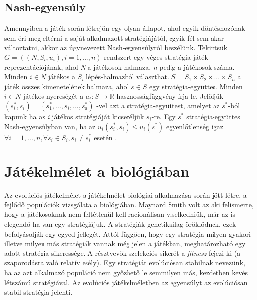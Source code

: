 \subsection{Nash-egyensúly}
Amennyiben a játék során létrejön egy olyan állapot, ahol egyik döntéshozónak sem éri meg eltérni a saját alkalmazott stratégiájától, egyik fél sem akar változtatni, akkor az úgynevezett Nash-egyensúlyról beszélünk. Tekintsük \(G = ((N,S_i,u_i), i = 1,...,n)\) rendszert egy véges stratégia játék reprezentációjának, ahol \textit{N} a játékosok halmaza, \textit{n} pedig a játékosok száma. Minden \(i \in N\) játékos a \(S_i\) lépés-halmazból választhat. \(S = S_1 \times S_2 \times ... \times S_n\)  a játék összes kimenetelének halmaza, ahol \(s \in S\) egy stratégia-együttes. Minden \(i \in N\) játékos nyereségét a \(u_i:S \to \mathbb{R}\) hasznosságfüggvény írja le. Jelöljük \((s_i^*,s_i) = (s^*_1,...,s_i,...,s_n^*)\) -vel azt a stratégia-együttest, amelyet az \(s^*\)-ból kapunk ha az \textit{i} játékos stratégiáját kicseréljük \(s_i\)-re. Egy \(s^*\) stratégia-együttes Nash-e\-gyen\-súly\-ban van, ha az \(u_i(s_i^*,s_i)\leq u_i(s^*) \) egyenlőtlenség igaz \(\forall i = 1,...,n, \forall s_i \in S_i, s_i \ne s_i^*\) esetén \cite{nash1951non}.


\section{Játékelmélet a biológiában}
Az evolúciós játékelmélet a játékelmélet biológiai alkalmazása során jött létre, a fejlődő populációk vizsgálata a biológiában. Maynard Smith volt az aki felismerte, hogy a játékosoknak nem feltétlenül kell racionálisan viselkedniük, már az is elegendő ha van egy stratégiájuk. A stratégiák genetikailag öröklődnek, ezek befolyásolják egy egyed jellegét. Attól függően, hogy egy stratégia milyen gyakori illetve milyen más stratégiák vannak még jelen a játékban, meghatározható egy adott stratégia sikeressége. A résztvevők szelekciós sikerét a \textit{fitnesz} fejezi ki (a szaporodásra való relatív esély). Egy stratégiát evolúciósan stabilnak nevezünk, ha az azt alkalmazó populáció nem győzhető le semmilyen más, kezdetben kevés létszámú stratégiával. Az evolúciós játékelméletben az egyensúlyt az evolúciósan stabil stratégia jelenti.

